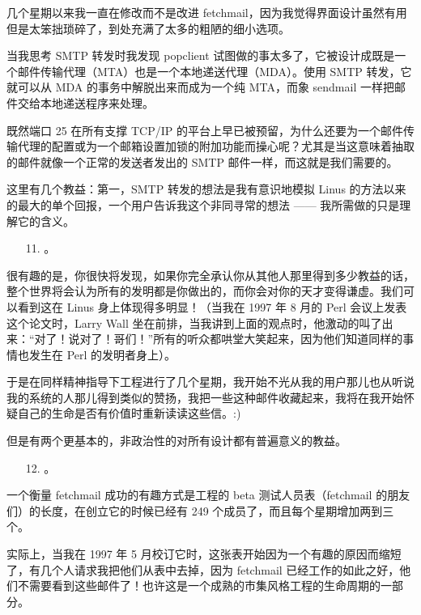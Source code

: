 几个星期以来我一直在修改而不是改进 fetchmail，因为我觉得界面设计虽然有用但是太笨拙琐碎了，到处充满了太多的粗陋的细小选项。


当我思考 SMTP 转发时我发现 popclient 试图做的事太多了，它被设计成既是一个邮件传输代理（MTA）也是一个本地递送代理（MDA）。使用 SMTP 转发，它就可以从 MDA 的事务中解脱出来而成为一个纯 MTA，而象 sendmail 一样把邮件交给本地递送程序来处理。


既然端口 25 在所有支撑 TCP/IP 的平台上早已被预留，为什么还要为一个邮件传输代理的配置或为一个邮箱设置加锁的附加功能而操心呢？尤其是当这意味着抽取的邮件就像一个正常的发送者发出的 SMTP 邮件一样，而这就是我们需要的。


这里有几个教益：第一，SMTP 转发的想法是我有意识地模拟 Linus 的方法以来的最大的单个回报，一个用户告诉我这个非同寻常的想法 —— 我所需做的只是理解它的含义。

\begin{enumerate}
\item[11.] 。
\end{enumerate}

很有趣的是，你很快将发现，如果你完全承认你从其他人那里得到多少教益的话，整个世界将会认为所有的发明都是你做出的，而你会对你的天才变得谦虚。我们可以看到这在 Linus 身上体现得多明显！（当我在 1997 年 8 月的 Perl 会议上发表这个论文时，Larry Wall 坐在前排，当我讲到上面的观点时，他激动的叫了出来：“对了！说对了！哥们！”所有的听众都哄堂大笑起来，因为他们知道同样的事情也发生在 Perl 的发明者身上）。


于是在同样精神指导下工程进行了几个星期，我开始不光从我的用户那儿也从听说我的系统的人那儿得到类似的赞扬，我把一些这种邮件收藏起来，我将在我开始怀疑自己的生命是否有价值时重新读读这些信。:)


但是有两个更基本的，非政治性的对所有设计都有普遍意义的教益。

\begin{enumerate}
\item[12.] 。
\end{enumerate}

一个衡量 fetchmail 成功的有趣方式是工程的 beta 测试人员表（fetchmail 的朋友们）的长度，在创立它的时候已经有 249 个成员了，而且每个星期增加两到三个。


实际上，当我在 1997 年 5 月校订它时，这张表开始因为一个有趣的原因而缩短了，有几个人请求我把他们从表中去掉，因为 fetchmail 已经工作的如此之好，他们不需要看到这些邮件了！也许这是一个成熟的市集风格工程的生命周期的一部分。

